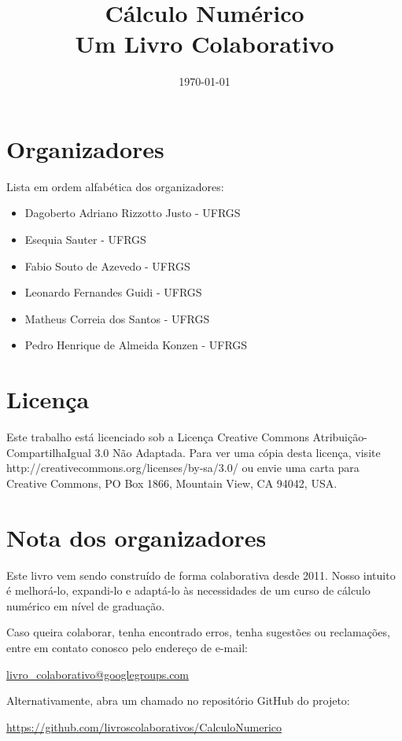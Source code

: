 \documentclass[12pt,a4paper]{book}
\begin{document}
\frontmatter

\title{Cálculo Numérico\\\small{Um Livro Colaborativo}}
\author{}
\date{\today}

\AddToShipoutPicture*{\BackgroundPic}
\maketitle


\chapter*{Organizadores}

Lista em ordem alfabética dos organizadores:
\begin{itemize}
\item[] Dagoberto Adriano Rizzotto Justo - UFRGS
\item[] Esequia Sauter - UFRGS
\item[] Fabio Souto de Azevedo - UFRGS
\item[] Leonardo Fernandes Guidi - UFRGS
\item[] Matheus Correia dos Santos - UFRGS
\item[] Pedro Henrique de Almeida Konzen - UFRGS
\end{itemize}

\chapter*{Licença}

Este trabalho está licenciado sob a Licença Creative Commons Atribuição-CompartilhaIgual 3.0 Não Adaptada. Para ver uma cópia desta licença, visite http://creativecommons.org/licenses/by-sa/3.0/ ou envie uma carta para Creative Commons, PO Box 1866, Mountain View, CA 94042, USA.
 
\chapter*{Nota dos organizadores}

Este livro vem sendo construído de forma colaborativa desde 2011. Nosso intuito é melhorá-lo, expandi-lo e adaptá-lo às necessidades de um curso de cálculo numérico em nível de graduação.

Caso queira colaborar, tenha encontrado erros, tenha sugestões ou reclamações, entre em contato conosco pelo endereço de e-mail:
\begin{center}
\url{livro_colaborativo@googlegroups.com}  
\end{center}
Alternativamente, abra um chamado no repositório GitHub do projeto:
\begin{center}
\url{https://github.com/livroscolaborativos/CalculoNumerico}  
\end{center}
\end{document}
